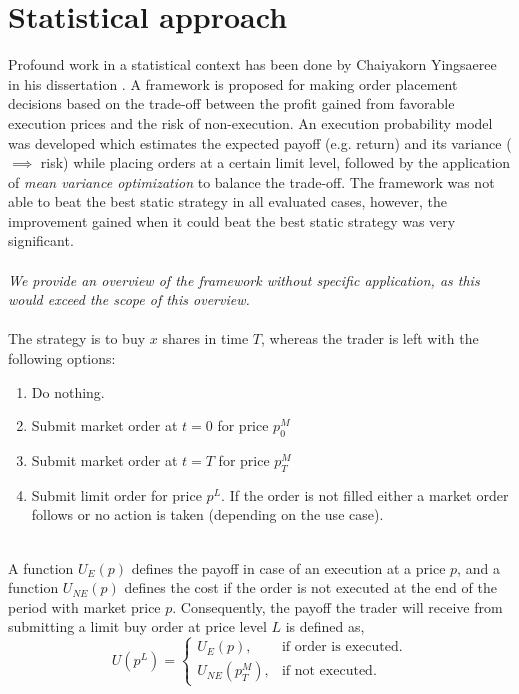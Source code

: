 \section{Statistical approach}

Profound work in a statistical context has been done by Chaiyakorn Yingsaeree in his dissertation \cite{yingsaeree2012algorithmic}.
A framework is proposed for making order placement decisions based on the trade-off between the profit gained from favorable execution prices and the risk of non-execution.
An execution probability model was developed which estimates the expected payoff (e.g. return) and its variance ($\implies$ risk) while placing orders at a certain limit level, followed by the application of \textit{mean variance optimization} to balance the trade-off.
The framework was not able to beat the best static strategy in all evaluated cases, however, the improvement gained when it could beat the best static strategy was very significant.
\\
\\
\textit{We provide an overview of the framework without specific application, as this would exceed the scope of this overview.}
\\
\\
The strategy is to buy $x$ shares in time $T$, whereas the trader is left with the following options:
\begin{enumerate}
    \item Do nothing.
    \item Submit market order at $t=0$ for price $p_{0}^M$
    \item Submit market order at $t=T$ for price $p_{T}^M$
    \item Submit limit order for price $p^L$. If the order is not filled either a market order follows or no action is taken (depending on the use case).
\end{enumerate}
\hfill
\\
A function $U_{E}(p)$ defines the payoff in case of an execution at a price $p$, and a function $U_{NE}(p)$ defines the cost if the order is not executed at the end of the period with market price $p$. 
Consequently, the payoff the trader will receive from submitting a limit buy order at price level $L$ is defined as,
\begin{equation}
    U(p^L) = \begin{cases}
                U_E(p), & \text{if order is executed}.\\
                U_{NE}(p_T^M), & \text{if not executed}.
             \end{cases}
\end{equation}
